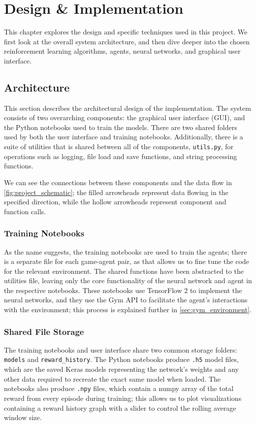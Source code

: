 \chapter{Design \& Implementation} \label{chp:design_implementation}
This chapter explores the design and specific techniques used in this project.
We first look at the overall system architecture, and then dive deeper into the
chosen reinforcement learning algorithms, agents, neural networks, and
graphical user interface.

\section{Architecture}
This section describes the architectural design of the implementation. The
system consists of two overarching components: the graphical user interface
(GUI), and the Python notebooks used to train the models. There are two shared
folders used by both the user interface and training notebooks. Additionally,
there is a suite of utilities that is shared between all of the components,
\lstinline{utils.py}, for operations such as logging, file load and save
functions, and string processing functions.

We can see the connections between these components and the data flow in
\autoref{fig:project_schematic}; the filled arrowheads represent data flowing
in the specified direction, while the hollow arrowheads represent component and
function calls.



\subsection{Training Notebooks}
As the name suggests, the training notebooks are used to train the agents;
there is a separate file for each game-agent pair, as that allows us to fine
tune the code for the relevant environment. The shared functions have been
abstracted to the utilities file, leaving only the core functionality of the
neural network and agent in the respective notebooks. These notebooks use
TensorFlow 2 to implement the neural networks, and they use the Gym API to
facilitate the agent's interactions with the environment; this process is
explained further in \autoref{sec:gym_environment}.

\subsection{Shared File Storage}
The training notebooks and user interface share two common storage folders:
\lstinline{models} and \lstinline{reward_history}. The Python notebooks produce
\lstinline{.h5} model files, which are the saved Keras models representing the
network's weights and any other data required to recreate the exact same model
when loaded. The notebooks also produce \lstinline{.npy} files, which contain a
numpy array of the total reward from every episode during training; this allows
us to plot visualizations containing a reward history graph with a slider to
control the rolling average window size.

